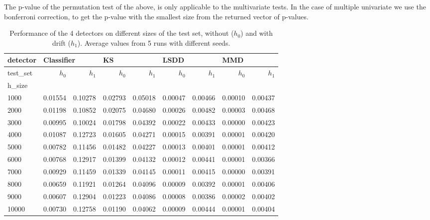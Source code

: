 \documentclass[12pt]{report}
\begin{document}
The p-value of the permutation test of the above, is only applicable to the multivariate tests.
In the case of multiple univariate we use the bonferroni correction, to get the p-value with the smallest size from the returned vector of p-values.


\begin{table}[h]
\begin{tabular}{|l|r|r|r|r|r|r|r|r|}
    \toprule
    detector & \multicolumn{2}{l|}{Classifier} & \multicolumn{2}{l|}{KS} & \multicolumn{2}{l|}{LSDD} & \multicolumn{2}{l|}{MMD} \\ \midrule
    test\_set &         \(h_0\) &      \(h_1\) &      \(h_0\) &      \(h_1\) &      \(h_0\) &      \(h_1\) &      \(h_0\) &      \(h_1\) \\ \midrule
    h\_size &            &         &         &         &         &         &         &         \\ \midrule
    \midrule
    1000   &    0.01554 & 0.10278 & 0.02793 & 0.05018 & 0.00047 & 0.00466 & 0.00010 & 0.00437 \\ \midrule
    2000   &    0.01198 & 0.10852 & 0.02075 & 0.04680 & 0.00026 & 0.00482 & 0.00003 & 0.00468 \\ \midrule
    3000   &    0.00995 & 0.10024 & 0.01798 & 0.04392 & 0.00022 & 0.00433 & 0.00000 & 0.00423 \\ \midrule
    4000   &    0.01087 & 0.12723 & 0.01605 & 0.04271 & 0.00015 & 0.00391 & 0.00001 & 0.00420 \\ \midrule
    5000   &    0.00782 & 0.11456 & 0.01482 & 0.04227 & 0.00013 & 0.00401 & 0.00001 & 0.00412 \\ \midrule
    6000   &    0.00768 & 0.12917 & 0.01399 & 0.04132 & 0.00012 & 0.00441 & 0.00001 & 0.00366 \\ \midrule
    7000   &    0.00929 & 0.11459 & 0.01339 & 0.04145 & 0.00011 & 0.00415 & 0.00000 & 0.00391 \\ \midrule
    8000   &    0.00659 & 0.11921 & 0.01264 & 0.04096 & 0.00009 & 0.00392 & 0.00001 & 0.00406 \\ \midrule
    9000   &    0.00607 & 0.12904 & 0.01223 & 0.04086 & 0.00008 & 0.00386 & 0.00002 & 0.00402 \\ \midrule
    10000  &    0.00730 & 0.12758 & 0.01190 & 0.04062 & 0.00009 & 0.00444 & 0.00001 & 0.00404 \\ \midrule
    \bottomrule
\end{tabular}
\caption{Performance of the 4 detectors on different sizes of the test set, without (\(h_0\)) and with drift (\(h_1\)). Average values from 5 runs with different seeds.}
\label{tab:distance}
\end{table}
\end{document}
